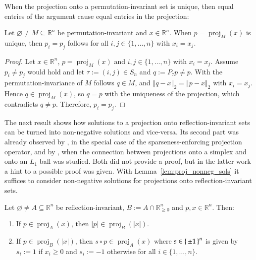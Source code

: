 \documentclass[twoside,11pt]{article}
\DeclareMathOperator{\proj}{proj}
\DeclareMathOperator{\hada}{\circ}
\newcommand{\R}{\mathbb{R}}
\newcommand{\0}{\mathcal{O}}
\newcommand{\norm}[1]{\left\Vert#1\right\Vert}
\newcommand{\abs}[1]{\left\vert #1 \right\vert}
\newcommand{\discint}[2]{\{#1,\dotsc,#2\}}
\newcommand{\inint}[2]{\in\discint{#1}{#2}}
\renewcommand{\emptyset}{\varnothing}
\begin{document}
When the projection onto a permutation-invariant set is unique, then equal entries of the argument cause equal entries in the projection:
\begin{remark}
Let $\emptyset\neq M\subseteq\R^n$ be permutation-invariant and $x\in\R^n$.
When $p = \proj_M(x)$ is unique, then $p_i = p_j$ follows for all $i,j\inint{1}{n}$ with $x_i = x_j$.
\end{remark}
\begin{proof}
Let $x\in\R^n$, $p = \proj_M(x)$ and $i,j\inint{1}{n}$ with $x_i = x_j$.
Assume $p_i\neq p_j$ would hold and let $\tau := (i, j)\in S_n$ and $q := P_\tau p \neq p$.
With the permutation-invariance of $M$ follows $q\in M$, and $\norm{q - x}_2 = \norm{p - x}_2$  with $x_i = x_j$.
Hence $q\in\proj_M(x)$, so $q = p$ with the uniqueness of the projection, which contradicts $q\neq p$.
Therefore, $p_i = p_j$.
\end{proof}
The next result shows how solutions to a projection onto reflection-invariant sets can be turned into non-negative solutions and vice-versa.
Its second part was already observed by \citet{Hoyer2004}, in the special case of the sparseness-enforcing projection operator, and by \citet{Duchi2008}, when the connection between projections onto a simplex and onto an $L_1$ ball was studied.
Both did not provide a proof, but in the latter work a hint to a possible proof was given.
With Lemma~\ref{lem:proj_nonneg_sols} it suffices to consider non-negative solutions for projections onto reflection-invariant sets.
\begin{lemma}
\label{lem:proj_nonneg_sols}
Let $\emptyset\neq A\subseteq\R^n$ be reflection-invariant, $B := A\cap\R_{\geq 0}^n$ and $p,x\in\R^n$.
Then:
\begin{enumerate}
\item \label{lem:proj_nonneg_sols_a}
If $p\in\proj_A(x)$, then $\abs{p}\in\proj_B(\abs{x})$.

\item \label{lem:proj_nonneg_sols_b}
If $p\in\proj_B(\abs{x})$, then $s\hada p\in\proj_A(x)$ where $s\in\set{\pm 1}^n$ is given by $s_i := 1$ if $x_i\geq 0$ and $s_i := -1$ otherwise for all $i\inint{1}{n}$.
\end{enumerate}
\end{lemma}
\end{document}
